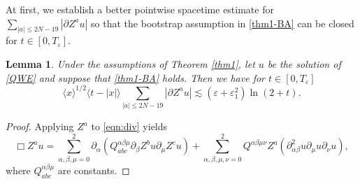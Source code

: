 \documentclass[11pt,twoside]{article}
\def\ds{\displaystyle}
\def\p{\partial}
\def\ve{\varepsilon}
\def\ls{\lesssim}
\newcommand{\w}[1]{\langle {#1} \rangle}
\theoremstyle{plain}
\newtheorem{lemma}[theorem]{Lemma}
\theoremstyle{definition}
\numberwithin{equation}{section}
\begin{document}
At first, we establish a better pointwise spacetime estimate for
$\ds\sum_{|a|\le2N-19}|\p Z^au|$ so that the bootstrap assumption in \eqref{thm1-BA} can be closed for $t\in[0,T_\ve]$.
\begin{lemma}
Under the assumptions of Theorem \ref{thm1}, let $u$ be the solution of \eqref{QWE} and suppose that \eqref{thm1-BA} holds.
Then we have for $t\in[0,T_\ve]$
\begin{equation}\label{BA:impr}
\w{x}^{1/2}\w{t-|x|}\sum_{|a|\le2N-19}|\p Z^au|\ls(\ve+\ve_1^2)\ln(2+t).
\end{equation}
\end{lemma}
\begin{proof}
Applying $Z^a$ to \eqref{eqn:div} yields
\begin{equation}\label{BA:impr1}
\Box Z^au=\sum_{\alpha,\beta,\mu=0}^2\p_{\alpha}(Q_{abc}^{\alpha\beta\mu}\p_{\beta}Z^bu\p_{\mu}Z^cu)
+\sum_{\alpha,\beta,\mu,\nu=0}^2Q^{\alpha\beta\mu\nu}Z^a(\p^2_{\alpha\beta}u\p_{\mu}u\p_{\nu}u),
\end{equation}
where $Q_{abc}^{\alpha\beta\mu}$ are constants.


\end{proof}
\end{document}
